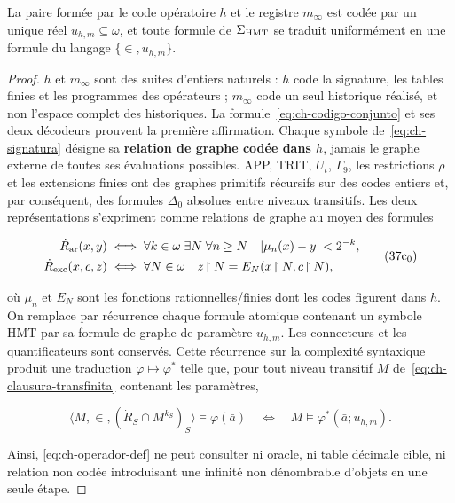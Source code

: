 \begin{lemma}
\label{thm:ch-6}
La paire formée par
le code opératoire \(h\) et le registre \(m_\infty\) est codée par un unique
réel \(u_{h,m}\subseteq\omega\), et toute formule de \(\Sigma_{\rm HMT}\) se
traduit uniformément en une formule du langage \(\{\in,u_{h,m}\}\).

\end{lemma}
\begin{proof}
\(h\) et \(m_\infty\) sont des suites d'entiers naturels : \(h\) code la signature, les tables finies et les programmes des opérateurs ; \(m_\infty\) code un seul historique réalisé, et non l'espace complet des historiques. La formule~\eqref{eq:ch-codigo-conjunto} et ses deux décodeurs prouvent la première affirmation. Chaque symbole de~\eqref{eq:ch-signatura} désigne sa \textbf{relation de graphe codée dans \(h\)}, jamais le graphe externe de toutes ses évaluations possibles. APP, TRIT, \(U_t\), \(\Gamma_9\), les restrictions \(\rho\) et les extensions finies ont des graphes primitifs récursifs sur des codes entiers et, par conséquent, des formules \(\Delta_0\) absolues entre niveaux transitifs. Les deux représentations s'expriment comme relations de graphe au moyen des formules

\[
 \begin{aligned}
 \dot R_{\rm ar}(x,y)
 &\;\Longleftrightarrow\;
 \forall k\in\omega\;\exists N\;\forall n\ge N\quad
 |\mu_n(x)-y|<2^{-k},\\
 \dot R_{\rm exc}(x,c,z)
 &\;\Longleftrightarrow\;
 \forall N\in\omega\quad z\!\upharpoonright N
   =E_N(x\!\upharpoonright N,c\!\upharpoonright N),
 \end{aligned}
\tag{37c$_0$}\label{eq:ch-grafos-publicacion}
\]

où \(\mu_n\) et \(E_N\) sont les fonctions rationnelles/finies dont les codes
figurent dans \(h\). On remplace par récurrence chaque formule atomique contenant
un symbole HMT par sa formule de graphe de paramètre \(u_{h,m}\). Les
connecteurs et les quantificateurs sont conservés. Cette récurrence sur la complexité
syntaxique produit une traduction \(\varphi\mapsto\varphi^*\) telle que, pour
tout niveau transitif \(M\) de~\eqref{eq:ch-clausura-transfinita} contenant les paramètres,

\[
 \langle M,\in,(\dot R_S\cap M^{k_S})_S\rangle
   \models\varphi(\bar a)
 \quad\Longleftrightarrow\quad
 M\models\varphi^*(\bar a;u_{h,m}).
\tag{37c}\label{eq:ch-eliminacion-uniforme}
\]

Ainsi, \eqref{eq:ch-operador-def} ne peut consulter ni oracle, ni table décimale cible, ni relation non codée introduisant une infinité non dénombrable d'objets en une seule étape.
\end{proof}

